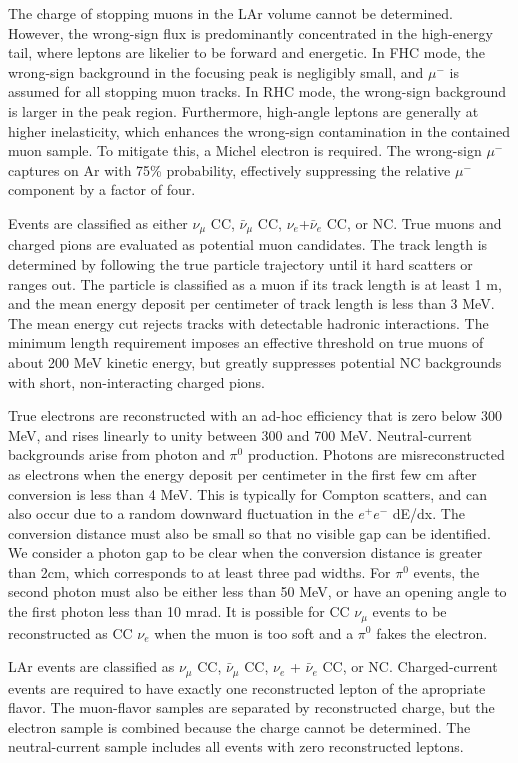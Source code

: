 The charge of stopping muons in the LAr volume cannot be determined. However, the wrong-sign flux is predominantly concentrated in the high-energy tail, where leptons are likelier to be forward and energetic. In FHC mode, the wrong-sign background in the focusing peak is negligibly small, and $\mu^{-}$ is assumed for all stopping muon tracks. In RHC mode, the wrong-sign background is larger in the peak region. Furthermore, high-angle leptons are generally at higher inelasticity, which enhances the wrong-sign contamination in the contained muon sample. To mitigate this, a Michel electron is required. The wrong-sign $\mu^{-}$ captures on Ar with 75\% probability, effectively suppressing the relative $\mu^{-}$ component by a factor of four.

Events are classified as either $\nu_{\mu}$ CC, $\bar{\nu}_{\mu}$ CC, $\nu_{e}$+$\bar{\nu}_{e}$ CC, or NC. True muons and charged pions are evaluated as potential muon candidates. The track length is determined by following the true particle trajectory until it hard scatters or ranges out. The particle is classified as a muon if its track length is at least 1 m, and the mean energy deposit per centimeter of track length is less than 3 MeV. The mean energy cut rejects tracks with detectable hadronic interactions. The minimum length requirement imposes an effective threshold on true muons of about 200 MeV kinetic energy, but greatly suppresses potential NC backgrounds with short, non-interacting charged pions.

True electrons are reconstructed with an ad-hoc efficiency that is zero below 300 MeV, and rises linearly to unity between 300 and 700 MeV. Neutral-current backgrounds arise from photon and $\pi^{0}$ production. Photons are misreconstructed as electrons when the energy deposit per centimeter in the first few cm after conversion is less than 4 MeV. This is typically for Compton scatters, and can also occur due to a random downward fluctuation in the $e^{+}e^{-}$ dE/dx. The conversion distance must also be small so that no visible gap can be identified. We consider a photon gap to be clear when the conversion distance is greater than 2cm, which corresponds to at least three pad widths. For $\pi^{0}$ events, the second photon must also be either less than 50 MeV, or have an opening angle to the first photon less than 10 mrad. It is possible for CC $\nu_{\mu}$ events to be reconstructed as CC $\nu_{e}$ when the muon is too soft and a $\pi^{0}$ fakes the electron.

LAr events are classified as $\nu_{\mu}$ CC, $\bar{\nu}_{\mu}$ CC, $\nu_{e}$ + $\bar{\nu}_{e}$ CC, or NC. Charged-current events are required to have exactly one reconstructed lepton of the apropriate flavor. The muon-flavor samples are separated by reconstructed charge, but the electron sample is combined because the charge cannot be determined. The neutral-current sample includes all events with zero reconstructed leptons.


